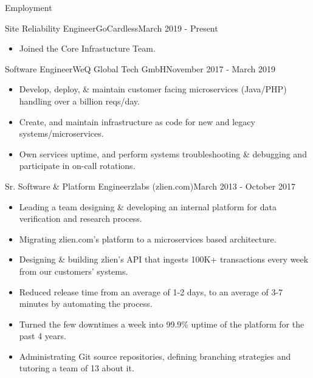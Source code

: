 \documentclass[]{mosabcv}
\begin{document}
\makeheader

\begin{cvsection}{Employment}
    \begin{cvsubsection}{Site Reliability Engineer}{GoCardless}{March 2019 - Present}
        \begin{itemize}
            \item Joined the Core Infrastucture Team.
        \end{itemize}
    \end{cvsubsection}
    
    \begin{cvsubsection}{Software Engineer}{WeQ Global Tech GmbH}{November 2017 - March 2019}
        \begin{itemize}
            \item Develop, deploy, \& maintain customer facing microservices (Java/PHP) handling over a billion reqs/day.
            \item Create, and maintain infrastructure as code for new and legacy systems/microservices.
            \item Own services uptime, and perform systems troubleshooting \& debugging and participate in on-call rotations.
        \end{itemize}
    \end{cvsubsection}
            
    \begin{cvsubsection}{Sr. Software \& Platform Engineer}{zlabs (zlien.com)}{March 2013 - October 2017}
        \begin{itemize}
            \item Leading a team designing \& developing an internal platform for data verification and research process.
            \item Migrating zlien.com's platform to a microservices based architecture.
            \item Designing \& building zlien's API that ingests 100K+ transactions every week from our customers' systems.
            \item Reduced release time from an average of 1-2 days, to an average of 3-7 minutes by automating the process.
            \item Turned the few downtimes a week into 99.9\% uptime of the platform for the past 4 years.
            \item Administrating Git source repositories, defining branching strategies and tutoring a team of 13 about it.
        \end{itemize}
    \end{cvsubsection}
    

\end{cvsection}
\end{document}
